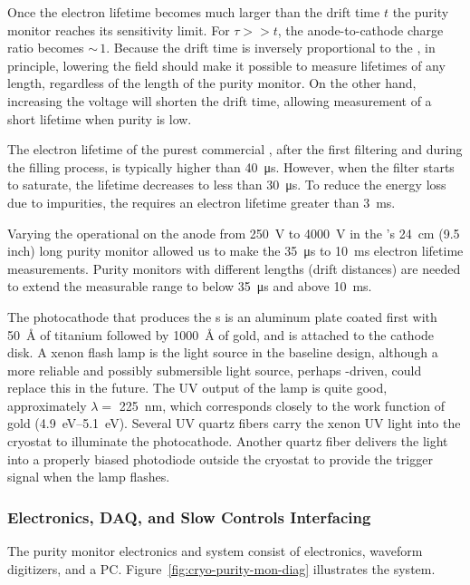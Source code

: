 Once the electron lifetime becomes much larger than the drift time $t$ the purity monitor reaches its sensitivity limit.  For $\tau >> t$, the anode-to-cathode charge ratio becomes $\sim\,1$. Because the drift time is inversely proportional to the \efield, in principle, lowering the %
field should make it possible to measure lifetimes of any length, regardless of the length of the purity monitor.
On the other hand, increasing the voltage will shorten the drift time, allowing measurement of a short lifetime when purity is low. 

The electron lifetime of the purest commercial , after the first filtering and during the filling process, is typically higher than \SI{40}{\micro\second}. However, when the filter starts to saturate, the lifetime decreases to less than \SI{30}{\micro\second}.  To %
reduce the energy loss due to impurities,  the  requires an electron lifetime greater than \SI{3}{\milli\second}.

Varying the operational  on the anode from \SI{250}{V} to \SI{4000}{V} in the 's \SI{24}{cm} (9.5 inch) long purity monitor allowed us to make the \SI{35}{\micro\second} to \SI{10}{\milli\second} electron lifetime measurements. 
Purity monitors with different lengths (drift distances) are needed to extend the measurable range to below \SI{35}{\micro\second} and above  \SI{10}{\milli\second}.

The photocathode that produces the \phel{}s is an aluminum plate coated first with \SI{50}{\angstrom} of titanium followed by \SI{1000}{\angstrom} of gold, and is attached to the cathode disk.
A xenon flash lamp is the light source in the baseline design, although %
a more reliable and possibly submersible light source, perhaps -driven, could replace this in the future. The UV output of the lamp is quite good, approximately $\lambda=$ \SI{225}{\nano\meter}, which corresponds closely to the work function of gold (\SIrange{4.9}{5.1}{\eV}). 
Several UV quartz fibers carry the xenon UV light into the cryostat to illuminate the %
photocathode.   Another quartz fiber delivers the light into a properly biased photodiode outside the cryostat to provide the trigger signal when the lamp flashes. 



\subsubsection{Electronics, DAQ, and Slow Controls Interfacing}
The purity monitor electronics and  system consist of  electronics, waveform digitizers, and a  PC.  Figure~\ref{fig:cryo-purity-mon-diag} %
illustrates the system.

